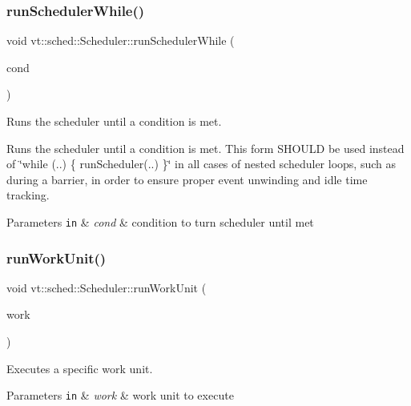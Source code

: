 \subsubsection{\texorpdfstring{run\+Scheduler\+While()}{runSchedulerWhile()}}
{\footnotesize\ttfamily void vt\+::sched\+::\+Scheduler\+::run\+Scheduler\+While (\begin{DoxyParamCaption}\item[{std\+::function$<$ bool()$>$}]{cond }\end{DoxyParamCaption})}



Runs the scheduler until a condition is met. 

Runs the scheduler until a condition is met. This form S\+H\+O\+U\+LD be used instead of \char`\"{}while (..) \{ run\+Scheduler(..) \}\char`\"{} in all cases of nested scheduler loops, such as during a barrier, in order to ensure proper event unwinding and idle time tracking.


\begin{DoxyParams}[1]{Parameters}
\mbox{\tt in}  & {\em cond} & condition to turn scheduler until met \\
\hline
\end{DoxyParams}
\mbox{\label{structvt_1_1sched_1_1_scheduler_ac4d5c3a4baf7a6cb6bdc2e8dc1a3af91}} 
\subsubsection{\texorpdfstring{run\+Work\+Unit()}{runWorkUnit()}}
{\footnotesize\ttfamily void vt\+::sched\+::\+Scheduler\+::run\+Work\+Unit (\begin{DoxyParamCaption}\item[{\hyperlink{structvt_1_1sched_1_1_scheduler_a398229f29b0940cea85aba4bae78b0be}{Unit\+Type} \&}]{work }\end{DoxyParamCaption})\hspace{0.3cm}{\ttfamily [private]}}



Executes a specific work unit. 


\begin{DoxyParams}[1]{Parameters}
\mbox{\tt in}  & {\em work} & work unit to execute \\
\hline
\end{DoxyParams}
\mbox{\label{structvt_1_1sched_1_1_scheduler_ad2653b260780c89a20e9253608ef1282}} 
